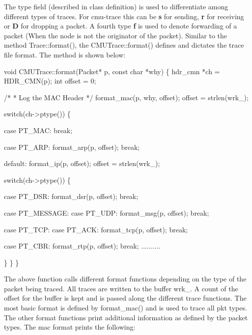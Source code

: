 The type field (described in  class definition) is used to
differentiate among different types of traces. For cmu-trace this can be
{\bf s} for sending, {\bf r} for receiving or {\bf D} for dropping a
packet. A fourth type {\bf f} is used to denote forwarding of a packet
(When the node is not the originator of the packet). 
Similar to the method Trace::format(), the CMUTrace::format() defines and
dictates the trace file format. The method is shown below: 
\begin{program}
void CMUTrace::format(Packet* p, const char *why)
\{
        hdr_cmn *ch = HDR_CMN(p);
        int offset = 0;

        /*
         * Log the MAC Header
         */
        format_mac(p, why, offset);
        offset = strlen(wrk_);

        switch(ch->ptype()) \{

        case PT_MAC:
                break;

        case PT_ARP:
                format_arp(p, offset);
                break;

        default:
                format_ip(p, offset);
                offset = strlen(wrk_);

                switch(ch->ptype()) \{

                case PT_DSR:
                        format_dsr(p, offset);
                        break;

                case PT_MESSAGE:
                case PT_UDP:
                        format_msg(p, offset);
                        break;
                        
                case PT_TCP:
                case PT_ACK:
                        format_tcp(p, offset);
                        break;
                        
                case PT_CBR:
                        format_rtp(p, offset);
                        break;
                ..........

                \}
        \}
\}
\end{program}
The above function calls different format functions depending on the type
of the packet being traced. All traces are written to the buffer wrk\_. A
count of the offset for the buffer is kept and is passed along the
different trace functions. The most basic format is defined by
format\_mac() and is used to trace all pkt types. The other format
functions print additional information as defined by the packet types. The
mac format prints the following:   
